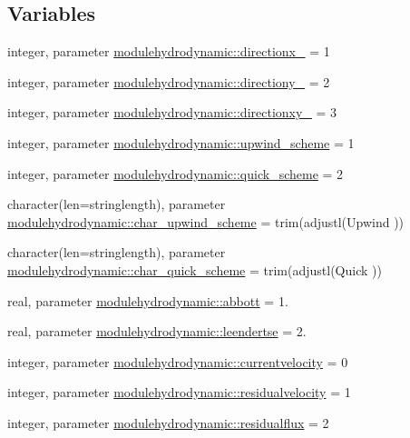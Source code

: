 \subsection*{Variables}
\begin{DoxyCompactItemize}
\item 
integer, parameter \mbox{\hyperlink{namespacemodulehydrodynamic_a67c3eb176a7e951a6d581c55fd3abe6b}{modulehydrodynamic\+::directionx\+\_\+}} = 1
\item 
integer, parameter \mbox{\hyperlink{namespacemodulehydrodynamic_a2f8213ce2a7db4198f421082f6047325}{modulehydrodynamic\+::directiony\+\_\+}} = 2
\item 
integer, parameter \mbox{\hyperlink{namespacemodulehydrodynamic_a1ad3170dbb160b604cb87024937cbb69}{modulehydrodynamic\+::directionxy\+\_\+}} = 3
\item 
integer, parameter \mbox{\hyperlink{namespacemodulehydrodynamic_abfec894219e1481b4825496dc98bfcf2}{modulehydrodynamic\+::upwind\+\_\+scheme}} = 1
\item 
integer, parameter \mbox{\hyperlink{namespacemodulehydrodynamic_a2a271d48aec2bf3160e26e6c6f89c67c}{modulehydrodynamic\+::quick\+\_\+scheme}} = 2
\item 
character(len=stringlength), parameter \mbox{\hyperlink{namespacemodulehydrodynamic_a828b31b29ee1dca289591bf9a36269e2}{modulehydrodynamic\+::char\+\_\+upwind\+\_\+scheme}} = trim(adjustl(\textquotesingle{}Upwind\textquotesingle{} ))
\item 
character(len=stringlength), parameter \mbox{\hyperlink{namespacemodulehydrodynamic_a4962eb3adfe61c30169233514394ab77}{modulehydrodynamic\+::char\+\_\+quick\+\_\+scheme}} = trim(adjustl(\textquotesingle{}Quick\textquotesingle{} ))
\item 
real, parameter \mbox{\hyperlink{namespacemodulehydrodynamic_a62654119689cd77c2b08514d7755b1b7}{modulehydrodynamic\+::abbott}} = 1.
\item 
real, parameter \mbox{\hyperlink{namespacemodulehydrodynamic_aeef650d7f61a5804ed5e66de705d43f1}{modulehydrodynamic\+::leendertse}} = 2.
\item 
integer, parameter \mbox{\hyperlink{namespacemodulehydrodynamic_a867e0a4829c59e0b2e02ed581005a9f7}{modulehydrodynamic\+::currentvelocity}} = 0
\item 
integer, parameter \mbox{\hyperlink{namespacemodulehydrodynamic_a8e04bbcc49d7b72be4c3907153cd11c0}{modulehydrodynamic\+::residualvelocity}} = 1
\item 
integer, parameter \mbox{\hyperlink{namespacemodulehydrodynamic_a977ab324d6c78f9961e3b3498072be28}{modulehydrodynamic\+::residualflux}} = 2

\end{DoxyCompactItemize}
